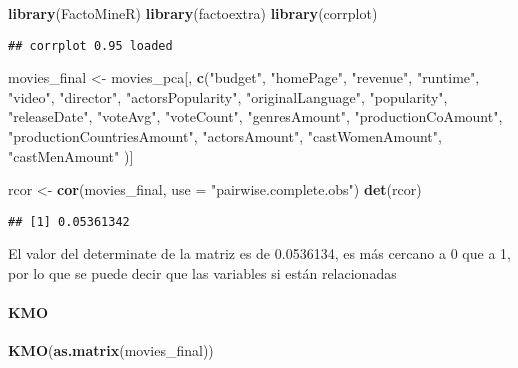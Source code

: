 \documentclass[
]{article}
\newenvironment{Shaded}{\begin{snugshade}}{\end{snugshade}}
\newcommand{\AttributeTok}[1]{\textcolor[rgb]{0.13,0.29,0.53}{#1}}
\newcommand{\FunctionTok}[1]{\textcolor[rgb]{0.13,0.29,0.53}{\textbf{#1}}}
\newcommand{\NormalTok}[1]{#1}
\newcommand{\OtherTok}[1]{\textcolor[rgb]{0.56,0.35,0.01}{#1}}
\newcommand{\StringTok}[1]{\textcolor[rgb]{0.31,0.60,0.02}{#1}}
\begin{document}
\begin{Shaded}
\begin{Highlighting}[]
\FunctionTok{library}\NormalTok{(FactoMineR)}
\FunctionTok{library}\NormalTok{(factoextra)}
\FunctionTok{library}\NormalTok{(corrplot)}
\end{Highlighting}
\end{Shaded}

\begin{verbatim}
## corrplot 0.95 loaded
\end{verbatim}

\begin{Shaded}
\begin{Highlighting}[]
\NormalTok{movies\_final }\OtherTok{\textless{}{-}}\NormalTok{ movies\_pca[, }\FunctionTok{c}\NormalTok{(}\StringTok{"budget"}\NormalTok{, }\StringTok{"homePage"}\NormalTok{, }\StringTok{"revenue"}\NormalTok{, }\StringTok{"runtime"}\NormalTok{, }\StringTok{"video"}\NormalTok{, }\StringTok{"director"}\NormalTok{, }\StringTok{"actorsPopularity"}\NormalTok{, }\StringTok{"originalLanguage"}\NormalTok{, }\StringTok{"popularity"}\NormalTok{, }\StringTok{"releaseDate"}\NormalTok{, }\StringTok{"voteAvg"}\NormalTok{, }\StringTok{"voteCount"}\NormalTok{, }\StringTok{"genresAmount"}\NormalTok{, }\StringTok{"productionCoAmount"}\NormalTok{, }\StringTok{"productionCountriesAmount"}\NormalTok{, }\StringTok{"actorsAmount"}\NormalTok{, }\StringTok{"castWomenAmount"}\NormalTok{, }\StringTok{"castMenAmount"}\NormalTok{ )]}


\NormalTok{rcor }\OtherTok{\textless{}{-}} \FunctionTok{cor}\NormalTok{(movies\_final, }\AttributeTok{use =} \StringTok{"pairwise.complete.obs"}\NormalTok{)}
\FunctionTok{det}\NormalTok{(rcor)}
\end{Highlighting}
\end{Shaded}

\begin{verbatim}
## [1] 0.05361342
\end{verbatim}

El valor del determinate de la matriz es de 0.0536134, es más cercano a
0 que a 1, por lo que se puede decir que las variables si están
relacionadas

\paragraph{KMO}\label{kmo}

\begin{Shaded}
\begin{Highlighting}[]
\FunctionTok{KMO}\NormalTok{(}\FunctionTok{as.matrix}\NormalTok{(movies\_final))}
\end{Highlighting}
\end{Shaded}
\end{document}
